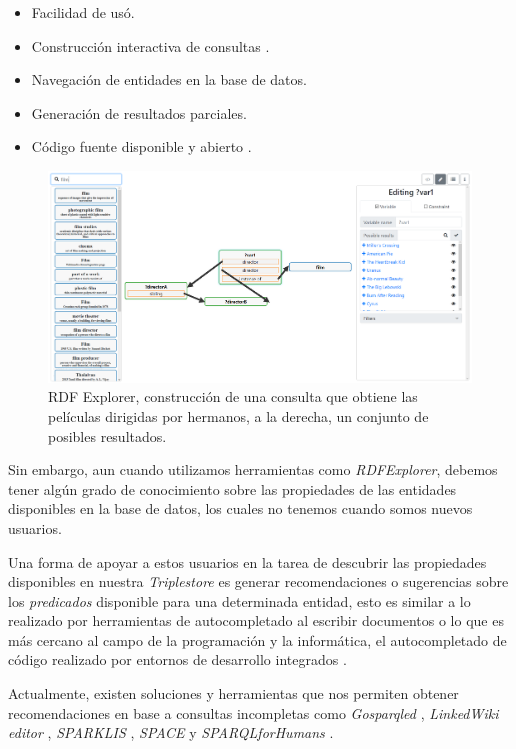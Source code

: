 \documentclass[conference,compsoc]{IEEEtran}
\begin{document}
\begin{itemize}
    \item Facilidad de usó.
    \item Construcción interactiva de consultas \spql.
    \item Navegación de entidades en la base de datos.
    \item Generación de resultados parciales.
    \item Código fuente disponible y abierto \cite{vargas2019rdfrepo}.
\end{itemize}

\begin{figure}
    \label{fig:rdfexplorer}
    \centering
    \includegraphics[width=\linewidth]{rdfexplorer.png}
    \caption{RDF Explorer, construcción de una consulta \spql que obtiene las
    películas dirigidas por hermanos, a la derecha, un conjunto de posibles
    resultados.}
\end{figure}

Sin embargo, aun cuando utilizamos herramientas como \textit{RDFExplorer},
debemos tener algún grado de conocimiento sobre las propiedades de las entidades
disponibles en la base de datos, los cuales no tenemos cuando somos nuevos
usuarios.

Una forma de apoyar a estos usuarios en la tarea de descubrir las propiedades
disponibles en nuestra \textit{Triplestore} es generar recomendaciones o
sugerencias sobre los \textit{predicados} disponible para una determinada
entidad, esto es similar a lo realizado por herramientas de autocompletado al
escribir documentos o lo que es más cercano al campo de la programación y la
informática, el autocompletado de código realizado por entornos de desarrollo
integrados \cite{bruch2009learning}.

Actualmente, existen soluciones y herramientas que nos permiten obtener
recomendaciones en base a consultas \spql incompletas como \textit{Gosparqled}
\cite{campinas2014live}, \textit{LinkedWiki editor} \cite{rafes2018designing},
\textit{SPARKLIS} \cite{ferre2017sparklis}, \textit{SPACE}
\cite{kramer2013space} y \textit{SPARQLforHumans}
\cite{parra2020autocompletion}.
\end{document}
